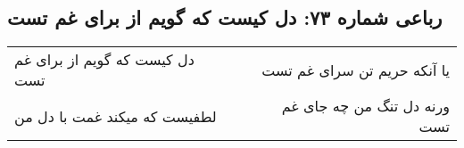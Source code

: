\begin{center}
\section*{رباعی شماره ۷۳: دل کیست که گویم از برای غم تست}
\label{sec:sh073}
\begin{longtable}{l p{0.5cm} r}
دل کیست که گویم از برای غم تست
&&
یا آنکه حریم تن سرای غم تست
\\
لطفیست که میکند غمت با دل من
&&
ورنه دل تنگ من چه جای غم تست
\\
\end{longtable}
\end{center}
